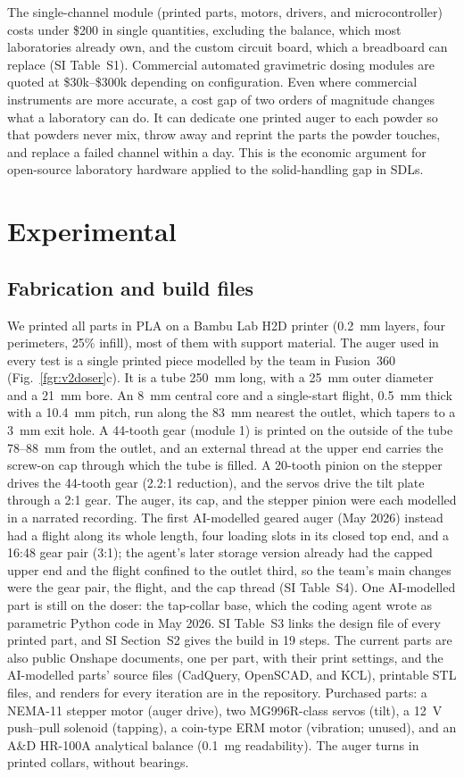 \documentclass[twoside,twocolumn,9pt]{article}
\begin{document}
The single-channel module (printed parts, motors, drivers, and microcontroller) costs under \$200 in single quantities, excluding the balance, which most laboratories already own, and the custom circuit board, which a breadboard can replace (SI Table~S1). Commercial automated gravimetric dosing modules are quoted at \$30k--\$300k depending on configuration. Even where commercial instruments are more accurate, a cost gap of two orders of magnitude changes what a laboratory can do. It can dedicate one printed auger to each powder so that powders never mix, throw away and reprint the parts the powder touches, and replace a failed channel within a day. This is the economic argument for open-source laboratory hardware\cite{Pearce2020Economic,Hohlbein2022Open} applied to the solid-handling gap in SDLs.

\section{Experimental}
\label{sec:methods}

\subsection{Fabrication and build files}
We printed all parts in PLA on a Bambu Lab H2D printer (0.2~mm layers, four perimeters, 25\% infill), most of them with support material. The auger used in every test is a single printed piece modelled by the team in Fusion~360 (Fig.~\ref{fgr:v2doser}c). It is a tube 250~mm long, with a 25~mm outer diameter and a 21~mm bore. An 8~mm central core and a single-start flight, 0.5~mm thick with a 10.4~mm pitch, run along the 83~mm nearest the outlet, which tapers to a 3~mm exit hole. A 44-tooth gear (module 1) is printed on the outside of the tube 78--88~mm from the outlet, and an external thread at the upper end carries the screw-on cap through which the tube is filled. A 20-tooth pinion on the stepper drives the 44-tooth gear (2.2:1 reduction), and the servos drive the tilt plate through a 2:1 gear. The auger, its cap, and the stepper pinion were each modelled in a narrated recording.\cite{FusionPlaylist} The first AI-modelled geared auger (May 2026) instead had a flight along its whole length, four loading slots in its closed top end, and a 16:48 gear pair (3:1); the agent's later storage version already had the capped upper end and the flight confined to the outlet third, so the team's main changes were the gear pair, the flight, and the cap thread (SI Table~S4). One AI-modelled part is still on the doser: the tap-collar base, which the coding agent wrote as parametric Python code in May 2026. SI Table~S3 links the design file of every printed part, and SI Section~S2 gives the build in 19 steps. The current parts are also public Onshape documents, one per part, with their print settings, and the AI-modelled parts' source files (CadQuery, OpenSCAD, and KCL), printable STL files, and renders for every iteration are in the repository. Purchased parts: a NEMA-11 stepper motor (auger drive), two MG996R-class servos (tilt), a 12~V push--pull solenoid (tapping), a coin-type ERM motor (vibration; unused), and an A\&D HR-100A analytical balance (0.1~mg readability). The auger turns in printed collars, without bearings.
\end{document}

